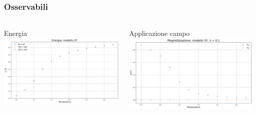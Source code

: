 \begin{frame}
    \frametitle{Osservabili}
    \framesubtitle{}

    \begin{columns}
        \begin{column}{0.5\textwidth}
            \begin{block}{Energia}
                \centering
                \includegraphics[width=\textwidth]{Immagini/simXY/eneXY.png}
            \end{block}
        \end{column}
    
        \begin{column}{0.5\textwidth}
            \begin{block}{Applicazione campo}
                \centering
                \includegraphics[width=\textwidth]{Immagini/simXY/magnXY.png}
            \end{block}
        \end{column}
    \end{columns}

\end{frame}
